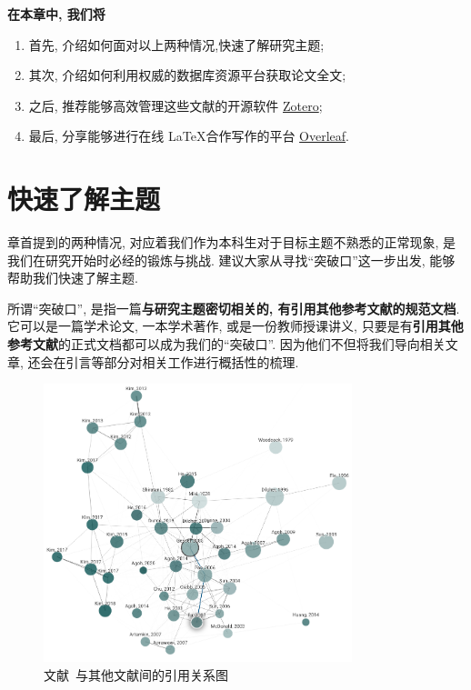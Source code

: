 \documentclass{formatBook}
\begin{document}
\textbf{在本章中, 我们将}
\begin{enumerate}
    \item 首先, 介绍如何面对以上两种情况,快速了解研究主题;
    \item 其次, 介绍如何利用权威的数据库资源平台获取论文全文;
    \item 之后, 推荐能够高效管理这些文献的开源软件 \href{https://www.zotero.org/}{Zotero};
    \item 最后, 分享能够进行在线 \LaTeX 合作写作的平台 \href{https://www.overleaf.com/}{Overleaf}.
\end{enumerate}

\section{快速了解主题}
章首提到的两种情况, 对应着我们作为本科生对于目标主题不熟悉的正常现象, 是我们在研究开始时必经的锻炼与挑战. 建议大家从寻找``突破口''这一步出发, 能够帮助我们快速了解主题.

所谓``突破口'', 是指一篇\textbf{与研究主题密切相关的, 有引用其他参考文献的规范文档}. 它可以是一篇学术论文, 一本学术著作, 或是一份教师授课讲义, 只要是有\textbf{引用其他参考文献}的正式文档都可以成为我们的``突破口''. 因为他们不但将我们导向相关文章, 还会在引言等部分对相关工作进行概括性的梳理.

\begin{figure}[H]
    \centering
    \includegraphics[width=0.8\textwidth]{figure/graph.png}
    \caption{文献~\cite{gessel2005miki}与其他文献间的引用关系图}
    \label{fig:mikiGrapg}
\end{figure}
\end{document}
